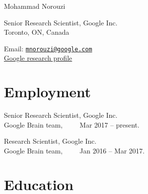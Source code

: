 \documentclass[10pt,letterpaper]{article}
\def\name{Mohammad Norouzi}
\renewenvironment{itemize}{
  \begin{list}{}{
    \setlength{\leftmargin}{1.5em}
  }
}{
  \end{list}
}
\begin{document}
{\huge \name}


\vspace{0.25in}

\begin{minipage}[t]{0.5\textwidth}
  Senior Research Scientist, Google Inc.\\
  Toronto, ON, Canada
\end{minipage}
\begin{minipage}[t]{0.5\textwidth}
  Email: \href{mailto:mnorouzi@google.com}{\tt mnorouzi@google.com} \\
  \href{https://research.google.com/pubs/MohammadNorouzi.html}{Google research profile} \\
\end{minipage}

\section*{Employment}

\begin{itemize}
  \item Senior Research Scientist, Google Inc.\\
    Google Brain team,~~~~~Mar 2017 -- present.
  \item Research Scientist, Google Inc.\\
    Google Brain team,~~~~~Jan 2016 -- Mar 2017.
\end{itemize}

\section*{Education}
\end{document}
